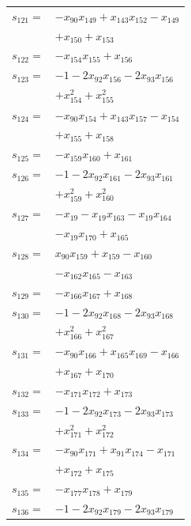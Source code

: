 \begin{longtable}{@{}r@{\;}l@{}}
\(s_{121}=\) & \(\displaystyle -x_{90}x_{149} +x_{143}x_{152} -x_{149}\) \\
 & \(\displaystyle +x_{150} +x_{153}\) \\[3pt]
\(s_{122}=\) & \(\displaystyle -x_{154}x_{155} +x_{156}\) \\[3pt]
\(s_{123}=\) & \(\displaystyle -1 -2x_{92}x_{156} -2x_{93}x_{156}\) \\
 & \(\displaystyle +x_{154}^{2} +x_{155}^{2}\) \\[3pt]
\(s_{124}=\) & \(\displaystyle -x_{90}x_{154} +x_{143}x_{157} -x_{154}\) \\
 & \(\displaystyle +x_{155} +x_{158}\) \\[3pt]
\(s_{125}=\) & \(\displaystyle -x_{159}x_{160} +x_{161}\) \\[3pt]
\(s_{126}=\) & \(\displaystyle -1 -2x_{92}x_{161} -2x_{93}x_{161}\) \\
 & \(\displaystyle +x_{159}^{2} +x_{160}^{2}\) \\[3pt]
\(s_{127}=\) & \(\displaystyle -x_{19} -x_{19}x_{163} -x_{19}x_{164}\) \\
 & \(\displaystyle -x_{19}x_{170} +x_{165}\) \\[3pt]
\(s_{128}=\) & \(\displaystyle x_{90}x_{159} +x_{159} -x_{160}\) \\
 & \(\displaystyle -x_{162}x_{165} -x_{163}\) \\[3pt]
\(s_{129}=\) & \(\displaystyle -x_{166}x_{167} +x_{168}\) \\[3pt]
\(s_{130}=\) & \(\displaystyle -1 -2x_{92}x_{168} -2x_{93}x_{168}\) \\
 & \(\displaystyle +x_{166}^{2} +x_{167}^{2}\) \\[3pt]
\(s_{131}=\) & \(\displaystyle -x_{90}x_{166} +x_{165}x_{169} -x_{166}\) \\
 & \(\displaystyle +x_{167} +x_{170}\) \\[3pt]
\(s_{132}=\) & \(\displaystyle -x_{171}x_{172} +x_{173}\) \\[3pt]
\(s_{133}=\) & \(\displaystyle -1 -2x_{92}x_{173} -2x_{93}x_{173}\) \\
 & \(\displaystyle +x_{171}^{2} +x_{172}^{2}\) \\[3pt]
\(s_{134}=\) & \(\displaystyle -x_{90}x_{171} +x_{91}x_{174} -x_{171}\) \\
 & \(\displaystyle +x_{172} +x_{175}\) \\[3pt]
\(s_{135}=\) & \(\displaystyle -x_{177}x_{178} +x_{179}\) \\[3pt]
\(s_{136}=\) & \(\displaystyle -1 -2x_{92}x_{179} -2x_{93}x_{179}\) \\

\end{longtable}
